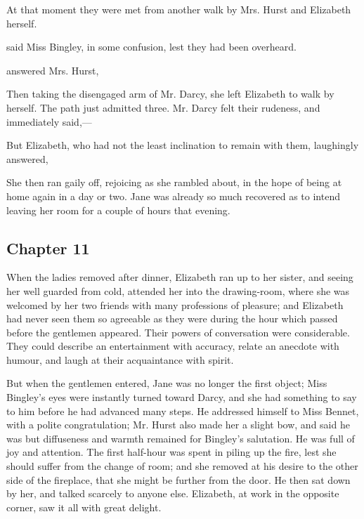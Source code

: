 
At that moment they were met from another walk by Mrs. Hurst and Elizabeth herself.

 said Miss Bingley, in some confusion, lest they had been overheard.

 answered Mrs. Hurst, 

Then taking the disengaged arm of Mr. Darcy, she left Elizabeth to walk by herself. The path just admitted three. Mr. Darcy felt their rudeness, and immediately said,---


But Elizabeth, who had not the least inclination to remain with them, laughingly answered,


She then ran gaily off, rejoicing as she rambled about, in the hope of being at home again in a day or two. Jane was already so much recovered as to intend leaving her room for a couple of hours that evening.

\subsection[chapter-11]{\useURL[url11][][][]\from[url11] Chapter 11}

When the ladies removed after dinner, Elizabeth ran up to her sister, and seeing her well guarded from cold, attended her into the drawing-room, where she was welcomed by her two friends with many professions of pleasure; and Elizabeth had never seen them so agreeable as they were during the hour which passed before the gentlemen appeared. Their powers of conversation were considerable. They could describe an entertainment with accuracy, relate an anecdote with humour, and laugh at their acquaintance with spirit.

But when the gentlemen entered, Jane was no longer the first object; Miss Bingley's eyes were instantly turned toward Darcy, and she had something to say to him before he had advanced many steps. He addressed himself to Miss Bennet, with a polite congratulation; Mr. Hurst also made her a slight bow, and said he was  but diffuseness and warmth remained for Bingley's salutation. He was full of joy and attention. The first half-hour was spent in piling up the fire, lest she should suffer from the change of room; and she removed at his desire to the other side of the fireplace, that she might be further from the door. He then sat down by her, and talked scarcely to anyone else. Elizabeth, at work in the opposite corner, saw it all with great delight.

